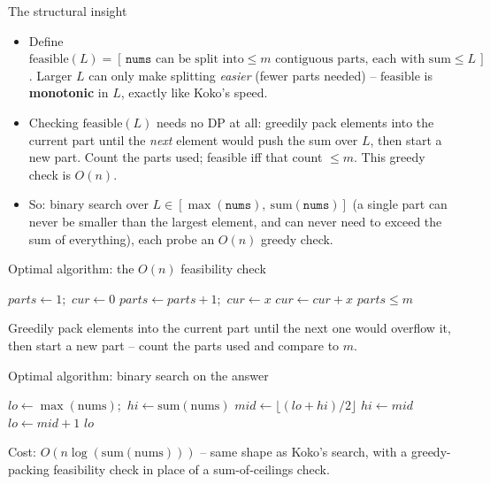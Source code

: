 \documentclass[11pt,aspectratio=169]{beamer}
\begin{document}
\begin{frame}{The structural insight}
  \begin{itemize}
    \item Define $\mathrm{feasible}(L) = [\,\texttt{nums} \text{ can be split into} \le m
    \text{ contiguous parts, each with sum} \le L\,]$. Larger $L$ can only make splitting
    \emph{easier} (fewer parts needed) -- $\mathrm{feasible}$ is \textbf{monotonic} in
    $L$, exactly like Koko's speed.
    \item Checking $\mathrm{feasible}(L)$ needs no DP at all: greedily pack elements into
    the current part until the \emph{next} element would push the sum over $L$, then
    start a new part. Count the parts used; feasible iff that count $\le m$. This greedy
    check is $O(n)$.
    \item So: binary search over $L \in [\max(\texttt{nums}),\ \mathrm{sum}(\texttt{nums})]$
    (a single part can never be smaller than the largest element, and can never need to
    exceed the sum of everything), each probe an $O(n)$ greedy check.
  \end{itemize}
\end{frame}

\begin{frame}{Optimal algorithm: the $O(n)$ feasibility check}
  \begin{algorithmic}[1]
      \State $parts \gets 1$;\ $cur \gets 0$
          \State $parts \gets parts + 1$;\ $cur \gets x$ 
        \Else
          \State $cur \gets cur + x$
        \EndIf
      \EndFor
      \State \Return $parts \le m$
    \EndFunction
  \end{algorithmic}
  Greedily pack elements into the current part until the next one would overflow it,
  then start a new part -- count the parts used and compare to $m$.
\end{frame}

\begin{frame}{Optimal algorithm: binary search on the answer}
  \begin{algorithmic}[1]
      \State $lo \gets \max(\text{nums})$;\ $hi \gets \mathrm{sum}(\text{nums})$
        \State $mid \gets \lfloor (lo+hi)/2 \rfloor$
         $hi \gets mid$ \Else\ $lo \gets mid+1$
        \EndIf
      \EndWhile
      \State \Return $lo$
    \EndFunction
  \end{algorithmic}
  Cost: $O(n \log(\mathrm{sum}(\text{nums})))$ -- same shape as Koko's search, with a
  greedy-packing feasibility check in place of a sum-of-ceilings check.
\end{frame}
\end{document}

